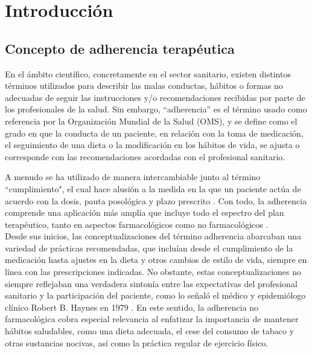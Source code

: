 \chapter{Introducción}

\section{Concepto de adherencia terapéutica}
En el ámbito científico, concretamente en el sector sanitario, existen distintos términos utilizados para describir las malas conductas, hábitos o formas no adecuadas de seguir las instrucciones y/o recomendaciones recibidas por parte de los profesionales de la salud. Sin embargo, ``adherencia'' es el término usado como referencia por la Organización Mundial de la Salud (OMS), y se define como el grado en que la conducta de un paciente, en relación con la toma de medicación, el seguimiento de una dieta o la modificación en los hábitos de vida, se ajusta o corresponde con las recomendaciones acordadas con el profesional sanitario. \cite{who2003adherence} 

A menudo se ha utilizado de manera intercambiable \cite{ibarra2017adherencia} junto al término ``cumplimiento", el cual hace alusión a la medida en la que un paciente actúa de acuerdo con la dosis, pauta posológica y plazo prescrito \cite{farmaindustria2023adherencia}. Con todo, la adherencia comprende una aplicación más amplia que incluye todo el espectro del plan terapéutico, tanto en aspectos farmacológicos como no farmacológicos \cite{libroblanco2021}. \\ 

Desde sus inicios, las conceptualizaciones del término adherencia abarcaban una variedad de prácticas recomendadas, que incluían desde el cumplimiento de la medicación hasta ajustes en la dieta y otros cambios de estilo de vida, siempre en línea con las prescripciones indicadas. No obstante, estas conceptualizaciones no siempre reflejaban una verdadera sintonía entre las expectativas del profesional sanitario y la participación del paciente, como lo señaló el médico y epidemiólogo clínico Robert B. Haynes en 1979 \cite{libroblanco2021}. En este sentido, la adherencia no farmacológica cobra especial relevancia al enfatizar la importancia de mantener hábitos saludables, como una dieta adecuada, el cese del consumo de tabaco y otras sustancias nocivas, así como la práctica regular de ejercicio físico. \\


